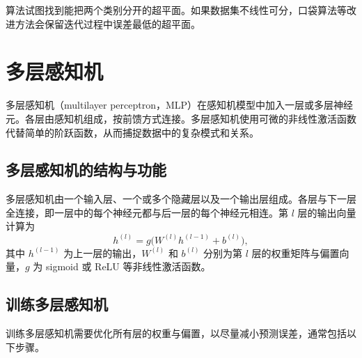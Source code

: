算法试图找到能把两个类别分开的超平面。如果数据集不线性可分，口袋算法等改进方法会保留迭代过程中误差最低的超平面。

\section{多层感知机}
\label{sec:appa-mlp}
多层感知机（multilayer perceptron，MLP）在感知机模型中加入一层或多层神经元。各层由感知机组成，按前馈方式连接。多层感知机使用可微的非线性激活函数代替简单的阶跃函数，从而捕捉数据中的复杂模式和关系。

\subsection{多层感知机的结构与功能}
多层感知机由一个输入层、一个或多个隐藏层以及一个输出层组成。各层与下一层全连接，即一层中的每个神经元都与后一层的每个神经元相连。第 $l$ 层的输出向量计算为
\begin{equation}
h^{(l)}=g\bigl(W^{(l)}h^{(l-1)}+b^{(l)}\bigr),
\label{eq:appa-mlp-layer}
\end{equation}
其中 $h^{(l-1)}$ 为上一层的输出，$W^{(l)}$ 和 $b^{(l)}$ 分别为第 $l$ 层的权重矩阵与偏置向量，$g$ 为 sigmoid 或 ReLU 等非线性激活函数。


\subsection{训练多层感知机}
训练多层感知机需要优化所有层的权重与偏置，以尽量减小预测误差，通常包括以下步骤。

